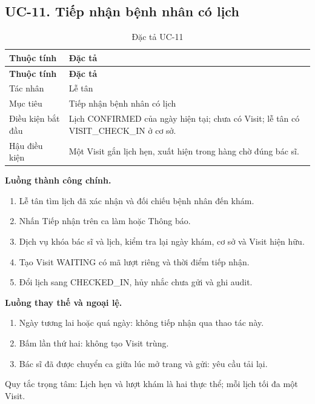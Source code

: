 \subsection{UC-11.\allowbreak{} Tiếp nhận bệnh nhân có lịch}
\label{uc:11}

{\small\setlength{\tabcolsep}{3pt}\renewcommand{\arraystretch}{1.12}
\begin{longtable}{@{}L{\textwidth-1.32pt\relax} L{\textwidth-4.68pt\relax}@{}}
\caption{Đặc tả UC-11}\\
\toprule
\textbf{Thuộc tính} & \textbf{Đặc tả}\\\midrule
\endfirsthead
\toprule
\textbf{Thuộc tính} & \textbf{Đặc tả}\\\midrule
\endhead
\bottomrule\endlastfoot
Tác nhân & Lễ tân\\[3pt]
Mục tiêu & Tiếp nhận bệnh nhân có lịch\\[3pt]
Điều kiện bắt đầu & Lịch CONFIRMED của ngày hiện tại; chưa có Visit; lễ tân có VISIT\_\allowbreak{}CHECK\_\allowbreak{}IN ở cơ sở.\allowbreak{}\\[3pt]
Hậu điều kiện & Một Visit gắn lịch hẹn, xuất hiện trong hàng chờ đúng bác sĩ.\allowbreak{}\\[3pt]
\end{longtable}}
\noindent\textbf{Luồng thành công chính.}
\begin{enumerate}
\item Lễ tân tìm lịch đã xác nhận và đối chiếu bệnh nhân đến khám.\allowbreak{}
\item Nhấn Tiếp nhận trên ca làm hoặc Thông báo.\allowbreak{}
\item Dịch vụ khóa bác sĩ và lịch, kiểm tra lại ngày khám, cơ sở và Visit hiện hữu.\allowbreak{}
\item Tạo Visit WAITING có mã lượt riêng và thời điểm tiếp nhận.\allowbreak{}
\item Đổi lịch sang CHECKED\_\allowbreak{}IN, hủy nhắc chưa gửi và ghi audit.\allowbreak{}
\end{enumerate}
\noindent\textbf{Luồng thay thế và ngoại lệ.}
\begin{enumerate}
\item Ngày tương lai hoặc quá ngày:\allowbreak{} không tiếp nhận qua thao tác này.\allowbreak{}
\item Bấm lần thứ hai:\allowbreak{} không tạo Visit trùng.\allowbreak{}
\item Bác sĩ đã được chuyển ca giữa lúc mở trang và gửi:\allowbreak{} yêu cầu tải lại.\allowbreak{}
\end{enumerate}
Quy tắc trọng tâm:\allowbreak{} Lịch hẹn và lượt khám là hai thực thể; mỗi lịch tối đa một Visit.\allowbreak{}

